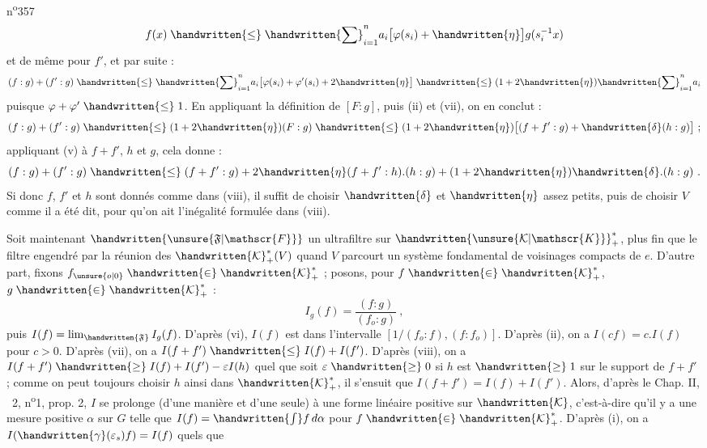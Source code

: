 n\textsuperscript{o}357
\[
f(x)\mathrel{\handwritten{\leq}}\handwritten{\sum}_{i=1}^{n}a_i\bigl[\varphi(s_i)+\handwritten{\eta}\bigr]g(s_i^{-1}x)
\]
et de même pour $f'$, et par suite :
\[
(f:g)+(f':g)\mathrel{\handwritten{\leq}}\handwritten{\sum}_{i=1}^{n}a_i\bigl[\varphi(s_i)+\varphi'(s_i)+2\handwritten{\eta}\bigr]\mathrel{\handwritten{\leq}}(1+2\handwritten{\eta})\handwritten{\sum}_{i=1}^{n}a_i
\]
puisque $\varphi+\varphi'\mathrel{\handwritten{\leq}}1$. En appliquant la définition de $[F:g]$, puis (ii) et (vii), on en conclut :
\[
(f:g)+(f':g)\mathrel{\handwritten{\leq}}(1+2\handwritten{\eta})(F:g)\mathrel{\handwritten{\leq}}(1+2\handwritten{\eta})\bigl[(f+f':g)+\handwritten{\delta}(h:g)\bigr]\ ;
\]
appliquant (v) à $f+f'$, $h$ et $g$, cela donne :
\[
(f:g)+(f':g)\mathrel{\handwritten{\leq}}(f+f':g)+2\handwritten{\eta}(f+f':h).(h:g)+(1+2\handwritten{\eta})\handwritten{\delta}.(h:g)\ .
\]
Si donc $f$, $f'$ et $h$ sont donnés comme dans (viii), il suffit de choisir $\handwritten{\delta}$ et $\handwritten{\eta}$ assez petits, puis de choisir $V$ comme il a été dit, pour qu'on ait l'inégalité formulée dans (viii).

Soit maintenant $\handwritten{\unsure{\mathfrak{F}|\mathscr{F}}}$ un ultrafiltre sur $\handwritten{\unsure{\mathcal{K}|\mathscr{K}}}^{\ast}_{+}$, plus fin que le filtre engendré par la réunion des $\handwritten{\mathcal{K}}^{\ast}_{+}(V)$ quand $V$ parcourt un système fondamental de voisinages compacts de $e$. D'autre part, fixons $f_{\unsure{o|0}}\mathrel{\handwritten{\in}}\handwritten{\mathcal{K}}^{\ast}_{+}$ ; posons, pour $f\mathrel{\handwritten{\in}}\handwritten{\mathcal{K}}^{\ast}_{+}$, $g\mathrel{\handwritten{\in}}\handwritten{\mathcal{K}}^{\ast}_{+}$ :
\[
I_g(f)=\frac{(f:g)}{(f_o:g)}\ ,
\]
puis $I(f)=\lim_{\handwritten{\mathfrak{F}}}I_g(f)$. D'après (vi), $I(f)$ est dans l'intervalle $[1/(f_o:f),(f:f_o)]$. D'après (ii), on a $I(cf)=c.I(f)$ pour $c>0$. D'après (vii), on a $I(f+f')\mathrel{\handwritten{\leq}}I(f)+I(f')$. D'après (viii), on a $I(f+f')\mathrel{\handwritten{\geq}}I(f)+I(f')-\varepsilon I(h)$ quel que soit $\varepsilon\mathrel{\handwritten{\geq}}0$ si $h$ est $\mathrel{\handwritten{\geq}}1$ sur le support de $f+f'$ ; comme on peut toujours choisir $h$ ainsi dans $\handwritten{\mathcal{K}}^{\ast}_{+}$, il s'ensuit que $I(f+f')=I(f)+I(f')$. Alors, d'après le Chap. II, \handwritten{\S}\ 2, n\textsuperscript{o}1, prop. 2, $I$ se prolonge (d'une manière et d'une seule) à une forme linéaire positive sur $\handwritten{\mathcal{K}}$, c'est-à-dire qu'il y a une mesure positive $\alpha$ sur $G$ telle que $I(f)=\handwritten{\int} f\,d\alpha$ pour $f\mathrel{\handwritten{\in}}\handwritten{\mathcal{K}}^{\ast}_{+}$. D'après (i), on a $I(\handwritten{\gamma}(\varepsilon_s)f)=I(f)$ quels que

